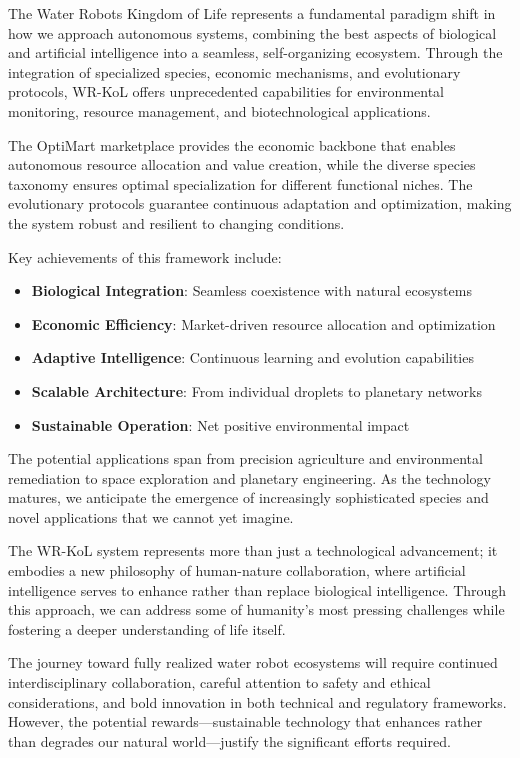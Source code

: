 \documentclass[11pt,a4paper]{article}
\begin{document}
The Water Robots Kingdom of Life represents a fundamental paradigm shift in how we approach autonomous systems, combining the best aspects of biological and artificial intelligence into a seamless, self-organizing ecosystem. Through the integration of specialized species, economic mechanisms, and evolutionary protocols, WR-KoL offers unprecedented capabilities for environmental monitoring, resource management, and biotechnological applications.

The OptiMart marketplace provides the economic backbone that enables autonomous resource allocation and value creation, while the diverse species taxonomy ensures optimal specialization for different functional niches. The evolutionary protocols guarantee continuous adaptation and optimization, making the system robust and resilient to changing conditions.

Key achievements of this framework include:

\begin{itemize}
    \item \textbf{Biological Integration}: Seamless coexistence with natural ecosystems
    \item \textbf{Economic Efficiency}: Market-driven resource allocation and optimization
    \item \textbf{Adaptive Intelligence}: Continuous learning and evolution capabilities
    \item \textbf{Scalable Architecture}: From individual droplets to planetary networks
    \item \textbf{Sustainable Operation}: Net positive environmental impact
\end{itemize}

The potential applications span from precision agriculture and environmental remediation to space exploration and planetary engineering. As the technology matures, we anticipate the emergence of increasingly sophisticated species and novel applications that we cannot yet imagine.

The WR-KoL system represents more than just a technological advancement; it embodies a new philosophy of human-nature collaboration, where artificial intelligence serves to enhance rather than replace biological intelligence. Through this approach, we can address some of humanity's most pressing challenges while fostering a deeper understanding of life itself.

The journey toward fully realized water robot ecosystems will require continued interdisciplinary collaboration, careful attention to safety and ethical considerations, and bold innovation in both technical and regulatory frameworks. However, the potential rewards—sustainable technology that enhances rather than degrades our natural world—justify the significant efforts required.
\end{document}
